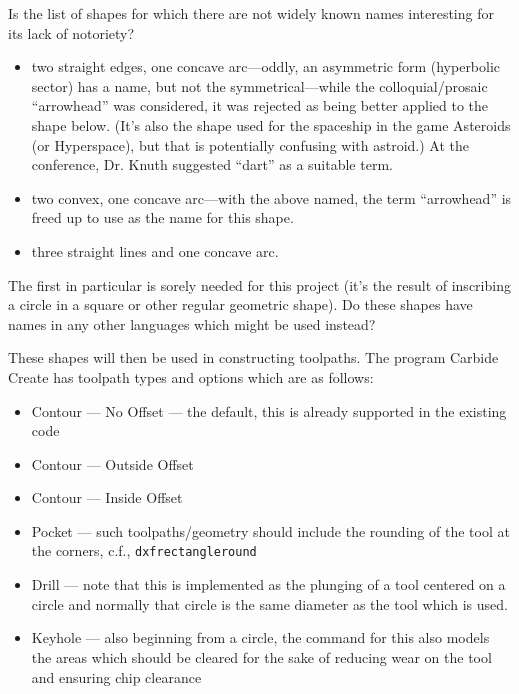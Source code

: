 \documentclass{ltxdoc}
\begin{document}
Is the list of shapes for which there are not widely known names interesting for its lack of notoriety?

\begin{itemize}
 \item two straight edges, one concave arc---oddly, an asymmetric form (hyperbolic sector) has a name, 
       but not the symmetrical---while the colloquial/prosaic ``arrowhead'' was considered, it was
       rejected as being better applied to the shape below. (It's also the shape used for the
       spaceship in the game Asteroids (or Hyperspace), but that  is potentially confusing with
       astroid.) At the  conference, Dr. Knuth suggested ``dart'' as a suitable term.
 \item two convex, one concave arc---with the above named, the term ``arrowhead'' is freed up to use
       as the name for this shape.
 \item three straight lines and one concave arc.
 \end{itemize}

 The first in particular is sorely needed for this project (it's the result of inscribing a circle in a square or other regular geometric shape). Do these shapes have names in any other languages which might be used instead?

These shapes will then be used in constructing toolpaths. The program Carbide Create has toolpath types and options which are as follows:

\begin{itemize}
 \item Contour --- No Offset --- the default, this is already supported in the existing code
 \item Contour --- Outside Offset
 \item Contour --- Inside Offset
 \item Pocket --- such toolpaths/geometry should include the rounding of the tool 
       at the corners, c.f., \verb|dxfrectangleround|
 \item Drill --- note that this is implemented as the plunging of a tool centered on a circle
                 and normally that circle is the same diameter as the tool which is used.
 \item Keyhole --- also beginning from a circle, the command for this also models the areas which
                   should be cleared for the sake of reducing wear
                   on the tool and ensuring chip clearance
\end{itemize}
\end{document}
